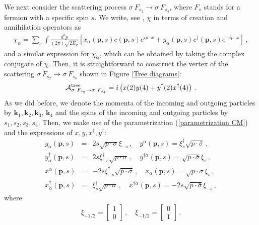 \documentclass[11pt]{article}
\begin{document}
We next consider the scattering process $\sigma~F_{s_2}\rightarrow \sigma~F_{s_4}$, where $F_s$ stands for a fermion with a specific spin $s$. We write, see \cite{Dreiner:2008tw}, $\chi$ in terms of creation and annihilation operators as 
%
\begin{eqnarray}
\chi_\alpha=\sum_{s}\int \frac{d^2 p}{(2\pi)\sqrt{2E_p}}\left[x_\alpha(\bm p,s)c(\bm p,s)e^{i p\cdot x}+y_{\alpha}(\bm p,s)c^\dagger(\bm p,s)e^{-ip\cdot x}\right]\,,
\end{eqnarray}
% 
and a similar expression for $\bar \chi_{\dot \alpha}$, which can be obtained by taking the complex conjugate of $\chi$. Then, it is straightforward to construct the vertex of the scattering $\sigma~F_{s_2}\rightarrow \sigma~F_{s_4}$ shown in Figure \ref{Tree diagrams}:
%
\begin{eqnarray}
{\cal A}^{\scriptsize\mbox{tree}}_{\sigma~F_{s_2}\rightarrow \sigma~F_{s_4}}=i\left(x(2)y(4)+y^\dagger(2)x^\dagger(4)\right)\,.
\label{vertex of sigma fermion to sigma fermion}
\end{eqnarray}
%
As we did before, we denote the momenta of the incoming and outgoing particles by $\bm k_1,\bm k_2,\bm k_3$, $\bm k_4$ and the spins of the  incoming and outgoing particles by $s_1,s_2,s_3,s_4$. Then, we make use of the parametrization (\ref{parametrization CM}) and the expressions of $x,y,x^\dagger,y^\dagger$:
%
\begin{eqnarray}
\nonumber
y_\alpha(\bm p,s)&=&2s\sqrt{ p\cdot \sigma}\xi_{-s}\,,\quad
y^\alpha(\bm p,s)=\xi_{s}^\dagger\sqrt{ p\cdot \bar\sigma}\,,\\
\nonumber
y^\dagger_{\dot \alpha}(\bm p,s)&=&2s\xi_{-s}^\dagger\sqrt{p\cdot \sigma}\,,\quad y^{\dagger\dot\alpha}(\bm p,s)=\sqrt{p\cdot \bar \sigma}\xi_{s}\,,\\
\nonumber
x^{\alpha}(\bm p,s)&=&-2s\xi_{-s}^\dagger \sqrt{p\cdot \bar \sigma}\,,\quad x_\alpha(\bm p,s)=\sqrt{p\cdot \sigma}\xi_{s}\,,\\
x^\dagger_{\dot\alpha}(\bm p,s)&=&\xi_{s}^\dagger\sqrt{p\cdot \sigma}\,,\quad
x^{\dagger\dot\alpha}(\bm p,s)=-2s\sqrt{p\cdot \bar\sigma}\xi_{-s}\,,
\label{relations to sigma}
\end{eqnarray}
%
where
%
\begin{eqnarray}
\xi_{+1/2}=\left[\begin{array}{c} 1\\0 \end{array}\right]\,,\quad \xi_{-1/2}=\left[\begin{array}{c} 0\\1 \end{array}\right]\,.
\end{eqnarray}
\end{document}
